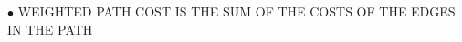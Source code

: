 \documentclass[preview]{standalone}
\begin{document}
\begin{center}
$\bullet$ WEIGHTED PATH COST IS THE SUM OF THE COSTS OF THE EDGES IN THE PATH
\end{center}
\end{document}
